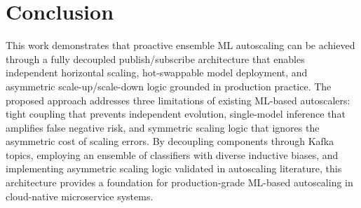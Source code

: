 \documentclass[conference]{IEEEtran}
\begin{document}
\section{Conclusion}

This work demonstrates that proactive ensemble ML autoscaling can be achieved through a fully decoupled publish/subscribe architecture that enables independent horizontal scaling, hot-swappable model deployment, and asymmetric scale-up/scale-down logic grounded in production practice. The proposed approach addresses three limitations of existing ML-based autoscalers: tight coupling that prevents independent evolution, single-model inference that amplifies false negative risk, and symmetric scaling logic that ignores the asymmetric cost of scaling errors. By decoupling components through Kafka topics, employing an ensemble of classifiers with diverse inductive biases, and implementing asymmetric scaling logic validated in autoscaling literature, this architecture provides a foundation for production-grade ML-based autoscaling in cloud-native microservice systems.



\end{document}
